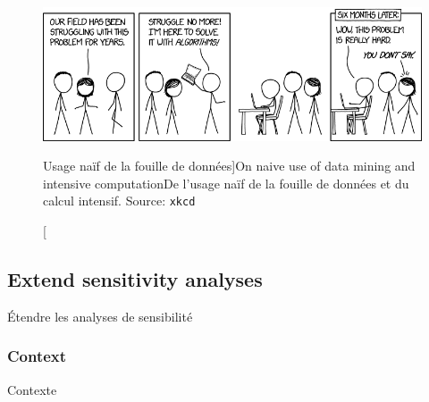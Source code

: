 \begin{figure}
\includegraphics[width=\linewidth]{Figures/Computation/here_to_help}
\caption[Naive use of data mining and computation][Usage naïf de la fouille de données]{On naive use of data mining and intensive computation\label{fig:computation:xkcd}}{De l'usage naïf de la fouille de données et du calcul intensif. Source: \texttt{xkcd}\label{fig:computation:xkcd}}
\end{figure}











\subsection{Extend sensitivity analyses}{Étendre les analyses de sensibilité}
	
	

\subsubsection{Context}{Contexte}


